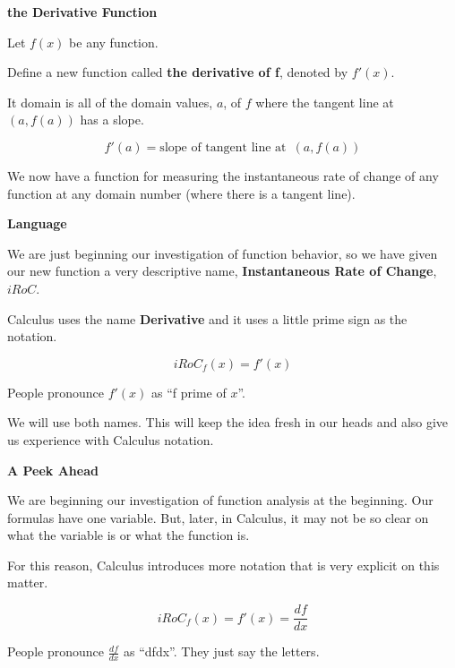 \documentclass{ximera}
\begin{document}
\begin{idea} \textbf{\textcolor{blue!55!black}{the Derivative Function}}  


Let $f(x)$ be any function.

Define a new function called \textbf{the derivative of f}, denoted by $f'(x)$.


It domain is all of the domain values, $a$, of $f$ where the tangent line at $(a, f(a))$ has a slope.

\[
f'(a) = \text{slope of tangent line at } \, (a, f(a))
\]


\end{idea}


We now have a function for measuring the instantaneous rate of change of any function at any domain number (where there is a tangent line). 






\begin{notation} \textbf{\textcolor{red!50!green}{Language}} 


We are just beginning our investigation of function behavior, so we have given our new function a very descriptive name, \textbf{\textcolor{blue!55!black}{Instantaneous Rate of Change}},  \textbf{\textcolor{blue!55!black}{$iRoC$}}. 


Calculus uses the name \textbf{\textcolor{blue!55!black}{Derivative}} and it uses a little prime sign as the notation.



\[
iRoC_f(x) = f'(x)
\]


People pronounce $f'(x)$ as ``f prime of $x$''.


\end{notation}

We will use both names.  This will keep the idea fresh in our heads and also give us experience with Calculus notation.






\begin{notation} \textbf{\textcolor{red!50!green}{A Peek Ahead}}


We are beginning our investigation of function analysis at the beginning.  Our formulas have one variable.  But, later, in Calculus, it may not be so clear on what the variable is or what the function is. 

For this reason, Calculus introduces more notation that is very explicit on this matter.



\[
iRoC_f(x) = f'(x) = \frac{df}{dx}
\]


People pronounce $\frac{df}{dx}$ as ``dfdx''.  They just say the letters.


\end{notation}
\end{document}
